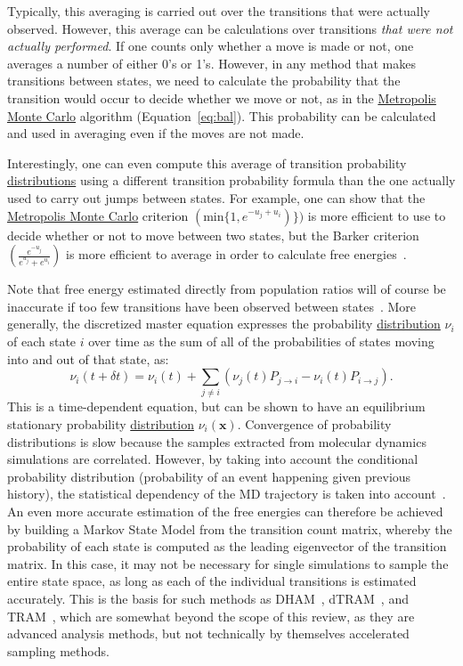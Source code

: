 \documentclass[9pt,review]{livecoms}
\newcommand{\vx}{\mathbf{x}}
\begin{document}
Typically, this averaging is carried out over the transitions that were actually observed. However, this average can be calculations over transitions \emph{that were not actually performed}. If one counts only whether a move is made or not, one averages a number of either 0's or 1's. However, in any method that makes transitions between states, we need to calculate the probability that the transition would occur to decide whether we move or not, as in the \hyperlink{ref:MetropolisMonteCarlo} {Metropolis Monte Carlo} algorithm (Equation~\ref{eq:bal}).  This probability can be calculated and used in averaging even if the moves are not made.

Interestingly, one can even compute this average of transition probability \hyperlink{ref:Distribution} {distributions} using a different transition probability formula than the one actually used to carry out jumps between states. For example, one can show that the \hyperlink{ref:MetropolisMonteCarlo} {Metropolis Monte Carlo} criterion $(\mathrm{min} \{1,e^{-u_j+u_i})\})$ is more efficient to use to decide whether or not to move between two states, but the Barker criterion $\left(\frac{e^{-u_j}}{e^{u_j}+e^{u_i}}\right)$ is more efficient to average in order to calculate free energies~\citep{Liu:Biometrika:1996}.

Note that free energy estimated directly from population ratios will of course be inaccurate if too few transitions have been observed between states~\cite{No2009}.  More generally, the discretized master equation expresses the probability \hyperlink{ref:Distribution} {distribution} $\nu_i$ of each state $i$ over time as the sum of all of the probabilities of states moving into and out of that state, as:
\begin{equation}
   \nu_i(t + \delta t) = \nu_i(t) + \sum_{j \neq i} (\nu_j(t) P_{j\rightarrow i} - \nu_i(t) P_{i\rightarrow j}).
   \label{eq:master_equation}
\end{equation}
This is a time-dependent equation, but can be shown to have an equilibrium stationary probability \hyperlink{ref:Distribution} {distribution} $\nu_i(\vx)$. Convergence of probability distributions is slow because the samples extracted from molecular dynamics simulations are correlated. However, by taking into account the conditional probability distribution (probability of an event happening given previous history), the statistical dependency of the MD trajectory is taken into account~\cite{Wu:JCP:2014,Wu:MMS:2014,Rosta2014,Wu:PNAS:2016a}.
An even more accurate estimation of the free energies can therefore be achieved by building a Markov State Model from the transition count matrix, whereby the probability of each state is computed as the leading eigenvector of the transition matrix. In this case, it may not be necessary for single simulations to sample the entire state space, as long as each of the individual transitions is estimated accurately.  This is the basis for such methods as DHAM~\cite{Rosta2014}, dTRAM~\cite{Wu:JCP:2014,Wu:MMS:2014}, and TRAM~\cite{Wu:PNAS:2016a}, which are somewhat beyond the scope of this review, as they are advanced analysis methods, but not technically by themselves accelerated sampling methods.
\end{document}
